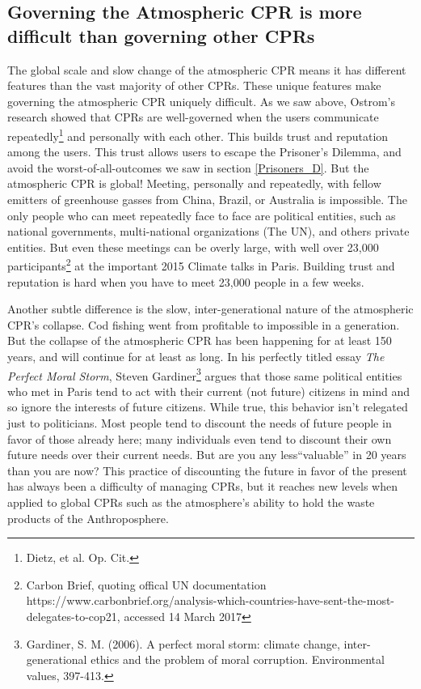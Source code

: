\documentclass[amstex,12pt]{book}
\begin{document}
\subsection{Governing the Atmospheric CPR is more difficult than governing other CPRs}
The global scale and slow change of the atmospheric CPR means it has different features than the vast majority of other CPRs. These unique features make governing the atmospheric CPR uniquely difficult. As we saw above, Ostrom's research showed that CPRs are well-governed when the users communicate repeatedly\footnote{Dietz,  et al. Op. Cit.} and personally with each other. This builds trust and reputation among the users. This trust allows users to escape the Prisoner's Dilemma, and avoid the worst-of-all-outcomes we saw in section \ref{Prisoners_D}. But the atmospheric CPR is global! Meeting, personally and repeatedly, with fellow emitters of greenhouse gasses from China, Brazil, or Australia is impossible. The only people who can meet repeatedly face to face are political entities, such as national governments, multi-national organizations (The UN), and others private entities. But even these meetings can be overly large, with well over 23,000 participants\footnote{Carbon Brief, quoting offical UN documentation https://www.carbonbrief.org/analysis-which-countries-have-sent-the-most-delegates-to-cop21, accessed 14 March 2017} at the important 2015 Climate talks in Paris. Building trust and reputation is hard when you have to meet 23,000 people in a few weeks.  

Another subtle difference is the slow, inter-generational nature of the atmospheric CPR's collapse. Cod fishing went from profitable to impossible in a generation. But the collapse of the atmospheric CPR has been happening for at least 150 years, and will continue for at least as long. In his perfectly titled essay \textit{The Perfect Moral Storm}, Steven Gardiner\footnote{Gardiner, S. M. (2006). A perfect moral storm: climate change, inter-generational ethics and the problem of moral corruption. Environmental values, 397-413.} argues that those same political entities who met in Paris tend to act with their current (not future) citizens in mind and so ignore the interests of future citizens. While true, this behavior isn't relegated just to politicians. Most people tend to discount the needs of future people in favor of those already here; many individuals even tend to discount their own future needs over their current needs. But are you any less``valuable'' in 20 years than you are now? This practice of discounting the future in favor of the present has always been a difficulty of managing CPRs, but it reaches new levels when applied to global CPRs such as the atmosphere's ability to hold the waste products of the Anthroposphere.  
\end{document}
